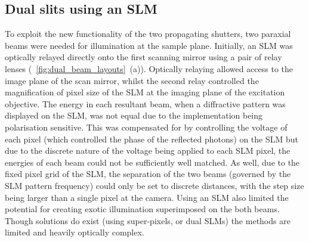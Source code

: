 \subsection{Dual slits using an \gls{SLM}}\label{sec:dualslits}

To exploit the new functionality of the two propagating shutters, two paraxial beams were needed for illumination at the sample plane.
Initially, an \gls{SLM} was optically relayed directly onto the first scanning mirror using a pair of relay lenses (\figurename~\ref{fig:dual_beam_layouts}~(a)).
Optically relaying allowed access to the image plane of the scan mirror, whilst the second relay controlled the magnification of pixel size of the \gls{SLM} at the imaging plane of the excitation objective.
The energy in each resultant beam, when a diffractive pattern was displayed on the \gls{SLM}, was not equal due to the implementation being polarisation sensitive.
This was compensated for by controlling the voltage of each pixel (which controlled the phase of the reflected photons) on the \gls{SLM} but due to the discrete nature of the voltage being applied to each \gls{SLM} pixel, the energies of each beam could not be sufficiently well matched.
As well, due to the fixed pixel grid of the \gls{SLM}, the separation of the two beams (governed by the \gls{SLM} pattern frequency) could only be set to discrete distances, with the step size being larger than a single pixel at the camera.
Using an \gls{SLM} also limited the potential for creating exotic illumination superimposed on the both beams.
Though solutions do exist (using super-pixels\cite{puttenSpatialAmplitudePhase2008}, or dual SLMs\cite{fuImagingMulticellularSpecimens2016}) the methods are limited and heavily optically complex.
